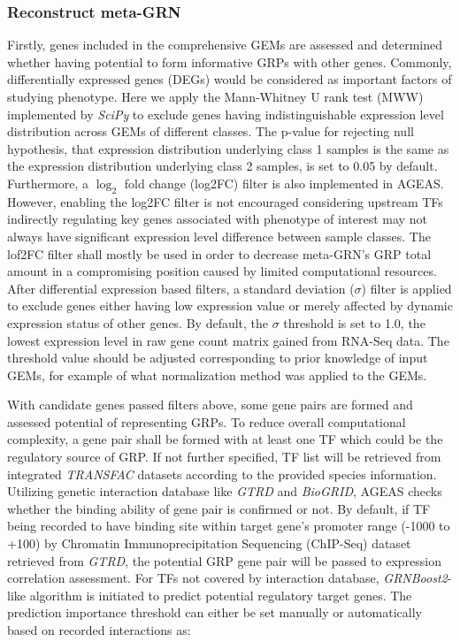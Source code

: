 \documentclass[fleqn,10pt]{wlscirep}
\begin{document}
    \subsubsection*{Reconstruct meta-GRN}
      Firstly, genes included in the comprehensive GEMs are assessed and determined whether having potential to form informative GRPs with other genes.
      Commonly, differentially expressed genes (DEGs) would be considered as important factors of studying phenotype.
      Here we apply the Mann-Whitney U rank test (MWW) implemented by \emph{SciPy}\cite{2020SciPy-NMeth} to exclude genes having indistinguishable expression level distribution across GEMs of different classes.
      The p-value for rejecting null hypothesis, that expression distribution underlying class 1 samples is the same as the expression distribution underlying class 2 samples, is set to 0.05 by default.
      Furthermore, a $\log_2$ fold change (log2FC) filter is also implemented in AGEAS.
      However, enabling the log2FC filter is not encouraged considering upstream TFs indirectly regulating key genes associated with phenotype of interest may not always have significant expression level difference between sample classes.
      The lof2FC filter shall mostly be used in order to decrease meta-GRN's GRP total amount in a compromising position caused by limited computational resources.
      After differential expression based filters, a standard deviation ($\sigma$) filter is applied to exclude genes either having low expression value or merely affected by dynamic expression status of other genes.
      By default, the $\sigma$ threshold is set to 1.0, the lowest expression level in raw gene count matrix gained from RNA-Seq data.
      The threshold value should be adjusted corresponding to prior knowledge of input GEMs, for example of what normalization method was applied to the GEMs.

      With candidate genes passed filters above, some gene pairs are formed and assessed potential of representing GRPs.
      To reduce overall computational complexity, a gene pair shall be formed with at least one TF which could be the regulatory source of GRP.
      If not further specified, TF list will be retrieved from integrated \emph{TRANSFAC}\cite{transfac} datasets according to the provided species information.
      Utilizing genetic interaction database like \emph{GTRD}\cite{gkaa1057} and \emph{BioGRID}\cite{biogrid}, AGEAS checks whether the binding ability of gene pair is confirmed or not.
      By default, if TF being recorded to have binding site within target gene's promoter range (-1000 to +100) by Chromatin Immunoprecipitation Sequencing (ChIP-Seq) dataset retrieved from \emph{GTRD}\cite{gkaa1057}, the potential GRP gene pair will be passed to expression correlation assessment.
      For TFs not covered by interaction database, \emph{GRNBoost2}\cite{grnboost2}-like algorithm is initiated to predict potential regulatory target genes.
      The prediction importance threshold can either be set manually or automatically based on recorded interactions as:
\end{document}
